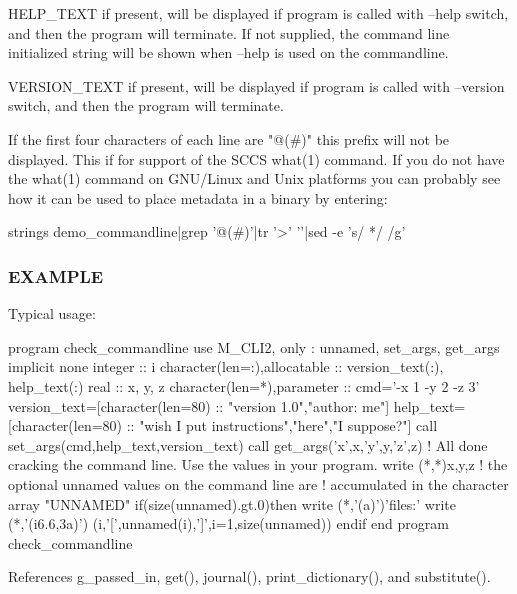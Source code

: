 \begin{DoxyVerb} HELP_TEXT     if present, will be displayed if program is called with
               --help switch, and then the program will terminate. If
               not supplied, the command line initialized string will be
               shown when --help is used on the commandline.

 VERSION_TEXT  if present, will be displayed if program is called with
               --version switch, and then the program will terminate.

    If the first four characters of each line are "@(#)" this prefix will
    not be displayed. This if for support of the SCCS what(1) command. If
    you do not have the what(1) command on GNU/Linux and Unix platforms
    you can probably see how it can be used to place metadata in a binary
    by entering:

        strings demo_commandline|grep '@(#)'|tr '>' '\n'|sed -e 's/  */ /g'
\end{DoxyVerb}


\subsubsection*{E\+X\+A\+M\+P\+LE}

Typical usage\+: \begin{DoxyVerb} program check_commandline
 use M_CLI2,  only : unnamed, set_args, get_args
 implicit none
 integer                      :: i
 character(len=:),allocatable :: version_text(:), help_text(:)
 real               :: x, y, z
 character(len=*),parameter :: cmd='-x 1 -y 2 -z 3'
    version_text=[character(len=80) :: "version 1.0","author: me"]
    help_text=[character(len=80) :: "wish I put instructions","here","I suppose?"]
    call set_args(cmd,help_text,version_text)
    call get_args('x',x,'y',y,'z',z)
    ! All done cracking the command line. Use the values in your program.
    write (*,*)x,y,z
    ! the optional unnamed values on the command line are
    ! accumulated in the character array "UNNAMED"
    if(size(unnamed).gt.0)then
       write (*,'(a)')'files:'
       write (*,'(i6.6,3a)') (i,'[',unnamed(i),']',i=1,size(unnamed))
    endif
 end program check_commandline \end{DoxyVerb}
 

References g\+\_\+passed\+\_\+in, get(), journal(), print\+\_\+dictionary(), and substitute().

